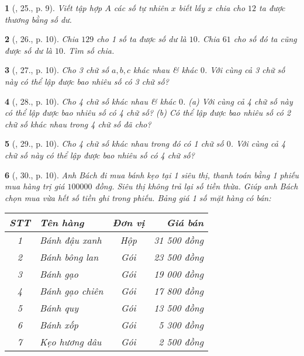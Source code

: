 \documentclass{article}
\newtheorem{baitoan}{}
\begin{document}
\begin{baitoan}[\cite{Tuyen_Toan_6}, 25., p. 9]
	Viết tập hợp $A$ các số tự nhiên $x$ biết lấy $x$ chia cho $12$ ta được thương bằng số dư.
\end{baitoan}

\begin{baitoan}[\cite{Tuyen_Toan_6}, 26., p. 10]
	Chia $129$ cho 1 số ta được số dư là $10$. Chia $61$ cho số đó ta cũng được số dư là $10$. Tìm số chia.
\end{baitoan}

\begin{baitoan}[\cite{Tuyen_Toan_6}, 27., p. 10]
	Cho 3 chữ số $a,b,c$ khác nhau \& khác $0$. Với cùng cả 3 chữ số này có thể lập được bao nhiêu số có 3 chữ số?
\end{baitoan}

\begin{baitoan}[\cite{Tuyen_Toan_6}, 28., p. 10]
	Cho 4 chữ số khác nhau \& khác $0$. (a) Với cùng cả 4 chữ số này có thể lập được bao nhiêu số có 4 chữ số? (b) Có thể lập được bao nhiêu số có 2 chữ số khác nhau trong 4 chữ số đã cho?
\end{baitoan}

\begin{baitoan}[\cite{Tuyen_Toan_6}, 29., p. 10]
	Cho 4 chữ số khác nhau trong đó có 1 chữ số $0$. Với cùng cả 4 chữ số này có thể lập được bao nhiêu số có 4 chữ số?
\end{baitoan}

\begin{baitoan}[\cite{Tuyen_Toan_6}, 30., p. 10]
	Anh Bách đi mua bánh kẹo tại 1 siêu thị, thanh toán bằng 1 phiếu mua hàng trị giá $100000$ đồng. Siêu thị không trả lại số tiền thừa. Giúp anh Bách chọn mua vừa hết số tiền ghi trong phiếu. Bảng giá 1 số mặt hàng có bán:
	\begin{table}[H]
		\centering
		\begin{tabular}{|c|l|c|r|}
			\hline
			STT & Tên hàng & Đơn vị & Giá bán \\
			\hline
			1 & Bánh đậu xanh & Hộp & 31 500 đồng \\
			\hline
			2 & Bánh bông lan & Gói & 23 500 đồng \\
			\hline
			3 & Bánh gạo & Gói & 19 000 đồng \\
			\hline
			4 & Bánh gạo chiên & Gói & 17 800 đồng \\
			\hline
			5 & Bánh quy & Gói & 13 500 đồng \\
			\hline
			6 & Bánh xốp & Gói & 5 300 đồng \\
			\hline
			7 & Kẹo hương dâu & Gói & 2 500 đồng \\
			\hline
		\end{tabular}
	\end{table}
\end{baitoan}
\end{document}
